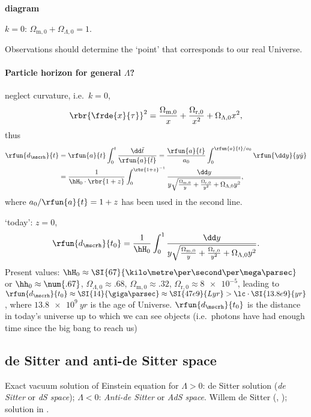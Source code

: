 \textbf{diagram}

$k = 0$: $\Omega_{\text{m},0} + \Omega_{\Lambda,0} = 1$.

Observations should determine the `point' that corresponds to our real Universe.

\paragraph{Particle horizon for general $\Lambda$?}

neglect curvature, i.e.\ $k = 0$,
\begin{equation}
\rbr{\frde{x}{\tau}}^2 = \frac{\Omega_{\text{m},0}}{x} + 
\frac{\Omega_{\text{r},0}}{x^2} + \Omega_{\Lambda,0} x^2,
\end{equation}
thus
\begin{align}
\rfun{d_\mscrh}{t} &= \rfun{a}{t}\int_0^t \frac{\dd\tilde{t}}%
{\rfun{a}{\tilde{t}}} = \frac{\rfun{a}{t}}{a_0}\int_0^{\rfun{a}{t}/a_0}
\rfun{\dd y}{y \dot{y}} \nonumber \\
&= \frac{1}{\hH_0\cdot\rbr{1+z}}\int_0^{\rbr{1+z}^{-1}}\frac{\dd y}%
{y\sqrt{\frac{\Omega_{\text{m},0}}{y}+\frac{\Omega_{\text{r},0}}{y^2} + 
\Omega_{\Lambda,0} y^2}},
\end{align}
where $a_0/\rfun{a}{t} = 1+z$ has been used in the second line.

`today': $z = 0$,
\begin{equation}
\rfun{d_\mscrh}{t_0} = \frac{1}{\hH_0}\int_0^1
\frac{\dd y}{y\sqrt{\frac{\Omega_{\text{m},0}}{y} + 
\frac{\Omega_{\text{r},0}}{y^2} + \Omega_{\Lambda,0} y^2}}.
\end{equation}
Present values: $\hH_0 \approx \SI{67}{\kilo\metre\per\second\per\mega\parsec}$ 
or $\hh_0 \approx \num{.67}$, $\Omega_{\Lambda,0} \approx \num{.68}$, 
$\Omega_{\text{m},0} \approx \num{.32}$, $\Omega_{\text{r},0} \approx 
\num{8e-5}$, leading to $\rfun{d_\mscrh}{t_0} \approx \SI{14}{\giga\parsec} 
\approx \SI{47e9}{Lyr} > \lc\cdot\SI{13.8e9}{yr}$, where $\SI{13.8e9}{yr}$ is 
the age of Universe. $\rfun{d_\mscrh}{t_0}$ is the distance in today's universe 
up to which we can see objects (i.e.\ photons have had enough time since the 
big bang to reach us)

\subsection{de Sitter and anti-de Sitter space}
\label{ssec:dS-AdS}

Exact vacuum solution of Einstein equation for $\Lambda > 0$: de Sitter 
solution (\emph{de Sitter} or \emph{dS space}); $\Lambda < 0$: \emph{Anti-de 
Sitter} or \emph{AdS space}. Willem de Sitter (, ); 
solution in \cite{de1917relativity,de1917curvature,Levi-Civia1917}.

